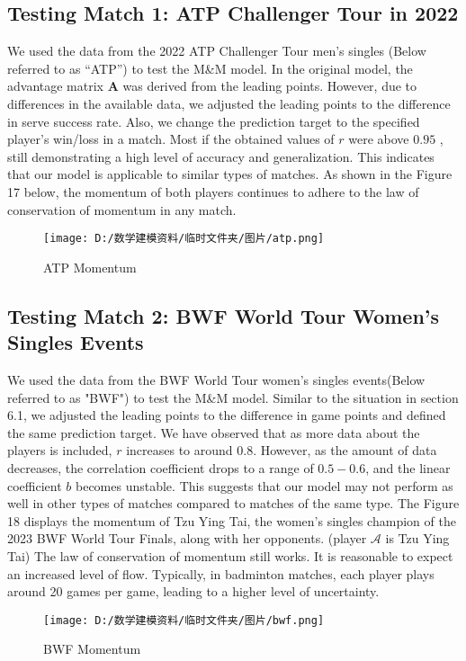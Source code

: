 \documentclass{mcmthesis}
\begin{document}
\subsection{Testing Match 1: ATP Challenger Tour in 2022}
We used the data from the 2022 ATP Challenger Tour men's singles (Below referred to as ``ATP'') to test the M\&M model. In the original model, the advantage matrix $\mathbf{A}$ was derived from the leading points. However, due to differences in the available data, we adjusted the leading points to the difference in serve success rate. Also, we change the prediction target to the specified player's win/loss in a match. 
Most if the obtained values of $r$ were above $0.95$ , still demonstrating a high level of accuracy and generalization. This indicates that our model is applicable to similar types of matches.
As shown in the Figure 17 below, the momentum of both players continues to adhere to the law of conservation of momentum in any match.
\begin{figure}[H]
	\small
	\centering
	\texttt{[image: D:/数学建模资料/临时文件夹/图片/atp.png]}
	\caption{ATP Momentum} \label{fig:aa}
\end{figure}
\subsection{Testing Match 2: BWF World Tour Women's Singles Events}
We used the data from the BWF World Tour women's singles events(Below referred to as "BWF") to test the M\&M model. Similar to the situation in section 6.1, we adjusted the leading points to the difference in game points and defined the same prediction target. 
We have observed that as more data about the players is included, $r$ increases to around $0.8$. However, as the amount of data decreases, the correlation coefficient drops to a range of $0.5-0.6$, and the linear coefficient $b$ becomes unstable. This suggests that our model may not perform as well in other types of matches compared to matches of the same type.
The Figure 18 displays the momentum of Tzu Ying Tai, the women's singles champion of the 2023 BWF World Tour Finals, along with her opponents. (player $\mathcal{A}$ is Tzu Ying Tai) The law of conservation of momentum still works. It is reasonable to expect an increased level of flow. Typically, in badminton matches, each player plays around 20 games per game, leading to a higher level of uncertainty.
\begin{figure}[H]
	\small
	\centering
	\texttt{[image: D:/数学建模资料/临时文件夹/图片/bwf.png]}
	\caption{BWF Momentum} \label{fig:aa}
\end{figure}
\end{document}
